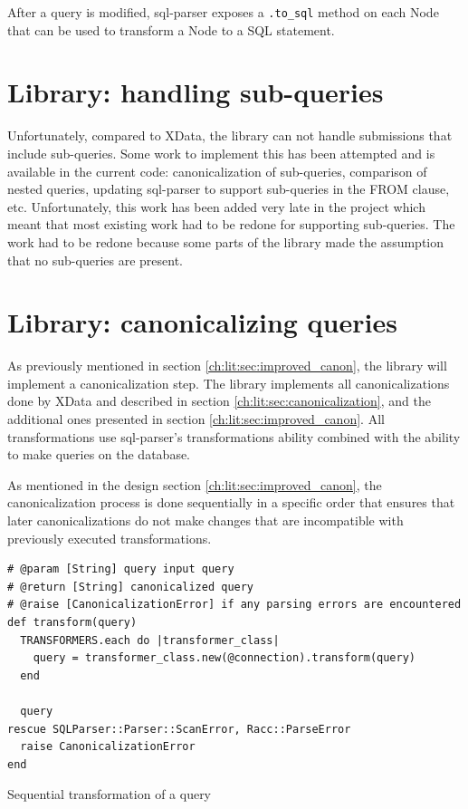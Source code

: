 After a query is modified, sql-parser exposes a \texttt{.to_sql} method on each Node that can be used to transform a Node to a SQL statement.

\section{Library: handling sub-queries}

Unfortunately, compared to XData, the library can not handle submissions that include sub-queries. Some work to implement this has been attempted and is available in the current code: canonicalization of sub-queries, comparison of nested queries, updating sql-parser to support sub-queries in the FROM clause, etc. Unfortunately, this work has been added very late in the project which meant that most existing work had to be redone for supporting sub-queries. The work had to be redone because some parts of the library made the assumption that no sub-queries are present.

\section{Library: canonicalizing queries}

As previously mentioned in section \ref{ch:lit:sec:improved_canon}, the library will implement a canonicalization step. The library implements all canonicalizations done by XData and described in section \ref{ch:lit:sec:canonicalization}, and the additional ones presented in section \ref{ch:lit:sec:improved_canon}. All transformations use sql-parser's transformations ability combined with the ability to make queries on the database.

As mentioned in the design section \ref{ch:lit:sec:improved_canon}, the canonicalization process is done sequentially in a specific order that ensures that later canonicalizations do not make changes that are incompatible with previously executed transformations. 

\begin{code}
\begin{verbatim}
# @param [String] query input query
# @return [String] canonicalized query
# @raise [CanonicalizationError] if any parsing errors are encountered
def transform(query)
  TRANSFORMERS.each do |transformer_class|
    query = transformer_class.new(@connection).transform(query)
  end

  query
rescue SQLParser::Parser::ScanError, Racc::ParseError
  raise CanonicalizationError
end
\end{verbatim}
\caption{Sequential transformation of a query}
\label{fig:sequential transformation of a query}
\end{code}

